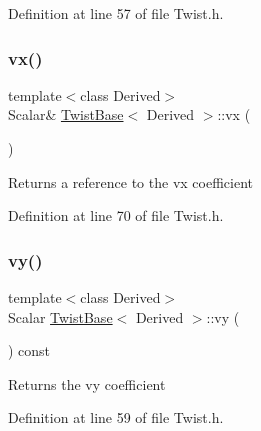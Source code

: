 Definition at line 57 of file Twist.\+h.

\hypertarget{class_twist_base_a8d4de5b2cf8cfdeab7146777cbeec798}{}\label{class_twist_base_a8d4de5b2cf8cfdeab7146777cbeec798} 
\subsubsection{\texorpdfstring{vx()}{vx()}\hspace{0.1cm}{\footnotesize\ttfamily [2/2]}}
{\footnotesize\ttfamily template$<$class Derived$>$ \\
Scalar\& \hyperlink{class_twist_base}{Twist\+Base}$<$ Derived $>$\+::vx (\begin{DoxyParamCaption}{ }\end{DoxyParamCaption})\hspace{0.3cm}{\ttfamily [inline]}}

\begin{DoxyReturn}{Returns}
a reference to the {\ttfamily vx} coefficient 
\end{DoxyReturn}


Definition at line 70 of file Twist.\+h.

\hypertarget{class_twist_base_a2cf70ed359f60d07610e8ab36910f436}{}\label{class_twist_base_a2cf70ed359f60d07610e8ab36910f436} 
\subsubsection{\texorpdfstring{vy()}{vy()}\hspace{0.1cm}{\footnotesize\ttfamily [1/2]}}
{\footnotesize\ttfamily template$<$class Derived$>$ \\
Scalar \hyperlink{class_twist_base}{Twist\+Base}$<$ Derived $>$\+::vy (\begin{DoxyParamCaption}{ }\end{DoxyParamCaption}) const\hspace{0.3cm}{\ttfamily [inline]}}

\begin{DoxyReturn}{Returns}
the {\ttfamily vy} coefficient 
\end{DoxyReturn}


Definition at line 59 of file Twist.\+h.

\hypertarget{class_twist_base_aea73eb77920e10bfdbc01cc1fd7956f8}{}\label{class_twist_base_aea73eb77920e10bfdbc01cc1fd7956f8} 
